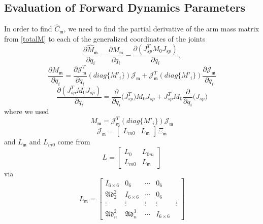 \documentclass[lettersize,journal]{IEEEtran}
\def \Add {\mathfrak{Ad}}
\begin{document}
\subsection{Evaluation of Forward Dynamics Parameters}
In order to find $\hat{C}_\mathfrak{m}$, we need to find the partial derivative of the arm mass matrix from \eqref{totalM} to each of the generalized coordinates of the joints
\begin{equation}
    \frac{\partial\hat{M}_{\mathfrak{m}}}{\partial q_i}=\frac{\partial{M}_{\mathfrak{m}}}{\partial q_i}-\frac{\partial{(J_{sp}^TM_0J_{sp})}}{\partial q_i},
\end{equation}
\begin{equation}
 \frac{\partial M_\mathfrak{m}}{\partial q_i}
=
\frac{\partial\mathcal{J}_\mathfrak{m}^T}{\partial q_i} (diag\{M'_i\})\mathcal{J}_\mathfrak{m}+\mathcal{J}_\mathfrak{m}^T(diag\{M'_i\})\frac{\partial \mathcal{J}_\mathfrak{m}}{\partial q_i} %
\end{equation}
\begin{equation}
    \frac{\partial (J_{sp}^TM_0J_{sp})}{\partial q_i}={\frac{\partial}{\partial q_i}(J_{sp}^T})M_0J_{sp}+ J_{sp}^TM_0{\frac{\partial}{\partial q_i}(J_{sp}})
\end{equation}
where we used
\begin{equation}
    M_\mathfrak{m}=\mathcal{J}_\mathfrak{m}^T(diag\{{M}'_i\})\mathcal{J}_\mathfrak{m}
\end{equation}
\begin{equation}
    \mathcal{J}_\mathfrak{m}=\begin{bmatrix}L_{m0}&L_\mathfrak{m}\end{bmatrix}\Xi_\mathfrak{m}
\end{equation}
and $L_\mathfrak{m}$ and $L_{m0}$ come from
\begin{equation}
    L=\begin{bmatrix}L_0&L_{0m}\\
    L_{m0}&L_\mathfrak{m}\end{bmatrix}
\end{equation}
via
\begin{equation}
    L_\mathfrak{m}=\begin{bmatrix} I_{6\times6}&0_6&\cdots&0_6\\ \Add^2_2 &I_{6\times6}&\cdots&0_6\\ \vdots &\vdots & \vdots &\vdots & \vdots\\ \Add^2_n &\Add^3_n&\cdots&I_{6\times6} \end{bmatrix}
\end{equation}
\end{document}
